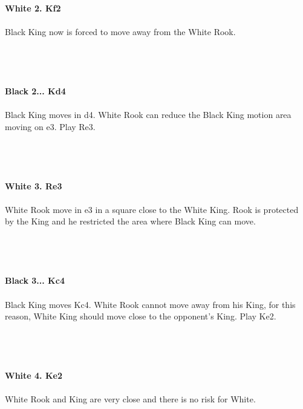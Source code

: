 \documentclass{article}
\begin{document}
\\

\\
\\
\textbf{White 2. Kf2}\\
\\
Black King now is forced to move away from the White Rook.\\\\
\\

\\
\\
\textbf{Black 2... Kd4}\\
\\
Black King moves in d4. White Rook can reduce the Black King motion area moving on e3. Play Re3.\\\\
\\

\\
\\
\textbf{White 3. Re3}\\
\\
White Rook move in e3 in a square close to the White King. Rook is protected by the King and he restricted the area where Black King can move.\\\\
\\

\\
\\
\textbf{Black 3... Kc4}\\
\\
Black King moves Kc4. White Rook cannot move away from his King, for this reason, White King should move close to the opponent's King. Play Ke2.\\\\
\\

\\
\\
\textbf{White 4. Ke2}\\
\\
White Rook and King are very close and there is no risk for White.\\\\
\\

\end{document}
